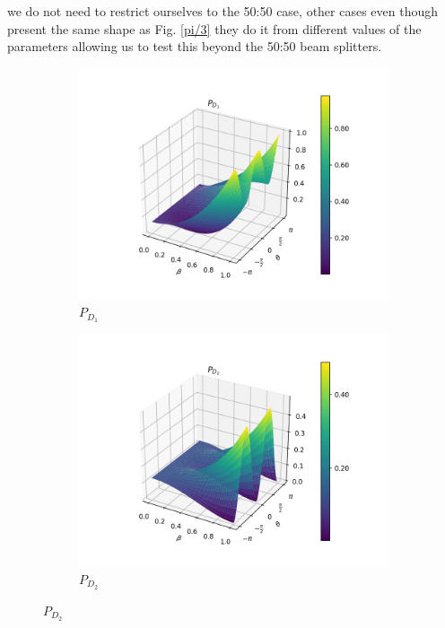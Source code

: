 \documentclass{book}
\begin{document}
 we do not need to restrict ourselves to the 50:50 case, other cases even though present the same shape as Fig. \ref{pi/3} they do it from different values of the parameters allowing us to test this beyond the 50:50 beam splitters.

\begin{figure}[H]
\centering
\begin{subfigure}[b]{0.30\linewidth}
\includegraphics[width=\linewidth]{images/pd1_3_pi4.png}
\caption{$P_{D_{1}}$}
\end{subfigure}
\begin{subfigure}[b]{0.30\linewidth}
\includegraphics[width=\linewidth]{images/pd2_3_pi4.png}
\caption{$P_{D_{2}}$ }
\label{fig:BS1}
\end{subfigure}

\end{figure}
\end{document}
